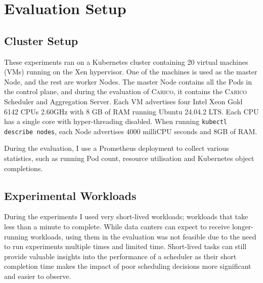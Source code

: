 \chapter{Evaluation Setup}

\section{Cluster Setup}

These experiments ran on a Kubernetes cluster containing 20 virtual machines
(VMs) running on the Xen hypervisor. One of the machines is used as the master
Node, and the rest are worker Nodes. The master Node contains all the Pods in
the control plane, and during the evaluation of \textsc{Carico}, it contains the \textsc{Carico}
Scheduler and Aggregation Server. Each VM advertises four Intel Xeon Gold 6142
CPUs \@ 2.60GHz with 8 GB of RAM running Ubuntu 24.04.2 LTS. Each CPU has a
single core with hyper-threading disabled. When running \texttt{kubectl describe
nodes}, each Node advertises $4000$ milliCPU seconds and 8GB of RAM.

During the evaluation, I use a Prometheus deployment \cite{} to collect various
statistics, such as running Pod count, resource utilisation and Kubernetes
object completions.

%

\section{Experimental Workloads}
During the experiments I used very short-lived workloads; workloads that take
less than a minute to complete. While data canters can expect to receive
longer-running workloads, using them in the evaluation was not feasible due to
the need to run experiments multiple times and limited time. Short-lived tasks
can still provide valuable insights into the performance of a scheduler as their
short completion time makes the impact of poor scheduling decisions more
significant and easier to observe.

